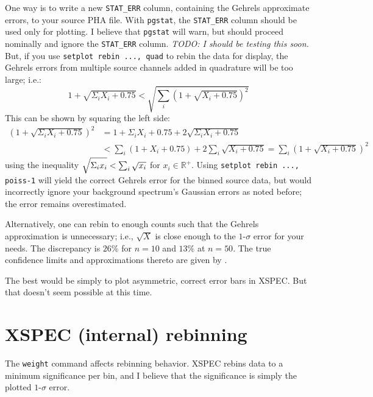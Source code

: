 \documentclass[onecolumn,tighten]{aastex6}
\newcommand*{\code}{\texttt}
\begin{document}
One way is to write a new \code{STAT\_ERR} column, containing the Gehrels
approximate errors, to your source PHA file.
With \code{pgstat}, the \code{STAT\_ERR} column should be used only for
plotting.
I believe that \code{pgstat} will warn, but should proceed nominally and
ignore the \code{STAT\_ERR} column.
\emph{TODO: I should be testing this soon.}
But, if you use \code{setplot rebin ..., quad} to rebin the data for display,
the Gehrels errors from multiple source channels added in quadrature will be
too large; i.e.:
\[
    1 + \sqrt{ \Sigma_i X_i + 0.75}
    <
    \sqrt{ \sum_i \left( 1 + \sqrt{X_i + 0.75} \right)^2 }
\]
This can be shown by squaring the left side:
\begin{align*}
    \left( 1 + \sqrt{ \Sigma_i X_i + 0.75} \right)^2
        &= 1 + \Sigma_i X_i + 0.75 + 2 \sqrt{ \Sigma_i X_i + 0.75 } \\
        &< \sum_i \left( 1 + X_i + 0.75 \right) + 2 \sum_i \sqrt{ X_i + 0.75 }
        = \sum_i \left( 1 + \sqrt{X_i + 0.75} \right)^2
\end{align*}
using the inequality $\sqrt{ \strut\Sigma_i x_i } < \sum_i \sqrt{x_i}$ for
$x_i \in \mathbb{R}^{+}$.
Using \code{setplot rebin ..., poiss-1} will yield the correct Gehrels error
for the binned source data, but would incorrectly ignore your background
spectrum's Gaussian errors as noted before; the error remains overestimated.

Alternatively, one can rebin to enough counts such that the Gehrels
approximation is unnecessary; i.e., $\sqrt{X}$ is close enough to the
$1$-$\sigma$ error for your needs.
The discrepancy is $26\%$ for $n=10$ and $13\%$ at $n=50$.
The true confidence limits and approximations thereto are given by
\citep[Table 4]{gehrels1986}.

The best would be simply to plot asymmetric, correct error bars in XSPEC.
But that doesn't seem possible at this time.


\section{XSPEC (internal) rebinning}

The \code{weight} command affects rebinning behavior.
XSPEC rebins data to a minimum significance per bin, and I believe that the
significance is simply the plotted $1$-$\sigma$ error.
\end{document}

